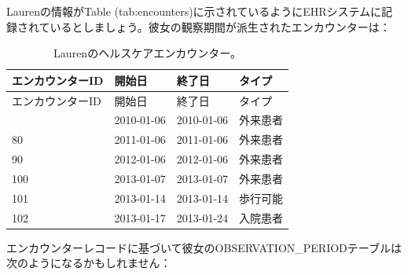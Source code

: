 \documentclass[
  11pt]{book}
\theoremstyle{definition}
\theoremstyle{definition}
\theoremstyle{definition}
\theoremstyle{definition}
\theoremstyle{remark}
\begin{document}
Laurenの情報がTable \citet{ref}(tab:encounters)に示されているようにEHRシステムに記録されているとしましょう。彼女の観察期間が派生されたエンカウンターは：

\begin{longtable}[]{@{}llll@{}}
\caption{\label{tab:encounters} Laurenのヘルスケアエンカウンター。}\tabularnewline
\toprule\noalign{}
エンカウンターID & 開始日 & 終了日 & タイプ \\
\midrule\noalign{}
\endfirsthead
\toprule\noalign{}
エンカウンターID & 開始日 & 終了日 & タイプ \\
\midrule\noalign{}
\endhead
\bottomrule\noalign{}
\endlastfoot
70 & 2010-01-06 & 2010-01-06 & 外来患者 \\
80 & 2011-01-06 & 2011-01-06 & 外来患者 \\
90 & 2012-01-06 & 2012-01-06 & 外来患者 \\
100 & 2013-01-07 & 2013-01-07 & 外来患者 \\
101 & 2013-01-14 & 2013-01-14 & 歩行可能 \\
102 & 2013-01-17 & 2013-01-24 & 入院患者 \\
\end{longtable}

エンカウンターレコードに基づいて彼女のOBSERVATION\_PERIODテーブルは次のようになるかもしれません：
\end{document}
